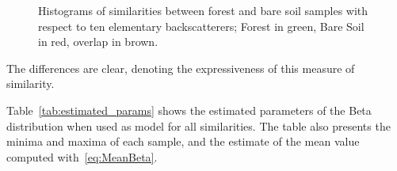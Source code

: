 \documentclass[conference]{IEEEtran}
\begin{document}
\begin{figure}[hbt]
%
%
%
%
\caption{Histograms of similarities between forest and bare soil samples with respect to ten elementary backscatterers; Forest in green, Bare Soil in red, overlap in brown.}\label{Fig:Histograms}
\end{figure}

The differences are clear, denoting the expressiveness of this measure of similarity.

Table~\ref{tab:estimated_params} shows the estimated parameters of the Beta distribution when used as model for all similarities.
The table also presents the minima and maxima of each sample, and the estimate of the mean value computed with~\eqref{eq:MeanBeta}.
\end{document}
